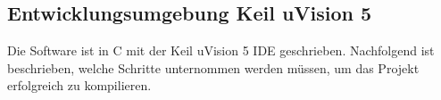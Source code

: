 \subsection{Entwicklungsumgebung Keil uVision 5}
\label{sec:IDE}

Die Software ist in C mit der Keil uVision 5 IDE geschrieben. Nachfolgend ist beschrieben, welche Schritte unternommen werden müssen, um das Projekt erfolgreich zu kompilieren.





